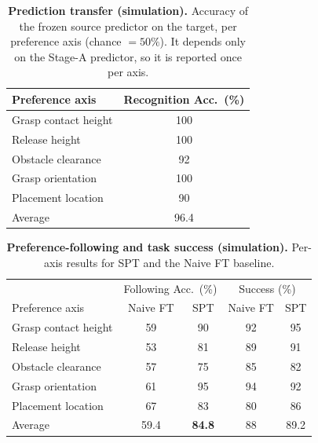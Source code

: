 \documentclass{article}
\begin{document}
\begin{table}[t]
  \centering
  \small
  \caption{\textbf{Prediction transfer (simulation).} Accuracy of the frozen
  source predictor on the target, per preference axis (chance $=50\%$). It
  depends only on the Stage-A predictor, so it is reported once per axis.}
  \label{tab:sim_recognition}
  \begin{tabular}{lc}
    \hline
    Preference axis & Recognition Acc.\ (\%) \\
    \hline
    Grasp contact height & 100 \\
    Release height       & 100 \\
    Obstacle clearance   & 92 \\
    Grasp orientation    & 100 \\
    Placement location   & 90 \\
    \hline
    Average              & 96.4 \\
    \hline
  \end{tabular}
\end{table}

\begin{table}[t]
  \centering
  \small
  \caption{\textbf{Preference-following and task success (simulation).} Per-axis
  results for SPT and the Naive FT baseline.}
  \label{tab:sim_main}
  \begin{tabular}{lcccc}
    \hline
    & \multicolumn{2}{c}{Following Acc.\ (\%)} & \multicolumn{2}{c}{Success (\%)} \\
    Preference axis & Naive FT & SPT & Naive FT & SPT \\
    \hline
    Grasp contact height & 59 & 90 & 92 & 95 \\
    Release height       & 53 & 81 & 89 & 91 \\
    Obstacle clearance   & 57 & 75 & 85 & 82 \\
    Grasp orientation    & 61 & 95 & 94 & 92 \\
    Placement location   & 67 & 83 & 80 & 86 \\
    \hline
    Average              & 59.4 & \textbf{84.8} & 88 & 89.2 \\
    \hline
  \end{tabular}
\end{table}
\end{document}
